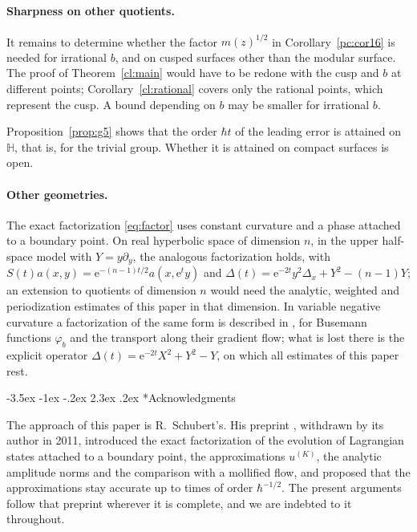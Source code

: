 \documentclass[twoside,10pt]{article}
\makeatletter
\numberwithin{equation}{section}
\theoremstyle{slbody}
\theoremstyle{remark}
\newcommand{\Hb}{\mathbb{H}}
\newcommand{\ue}{\mathrm{e}}
\renewcommand{\section}{%
  \@startsection{section}{1}{\z@}%
    {-3.5ex \@plus -1ex \@minus -.2ex}%
    {2.3ex \@plus .2ex}%
    {\normalfont\large\bfseries}}
\makeatother
\begin{document}
\paragraph{Sharpness on other quotients.} It remains to determine whether the factor $m(z)^{1/2}$ in Corollary~\ref{pc:cor16} is needed for irrational $b$,
and on cusped surfaces other than the modular surface. The proof of
Theorem~\ref{cl:main} would have to be redone with the cusp and $b$ at different
points; Corollary~\ref{cl:rational} covers only the rational points, which represent the cusp. A bound depending on $b$ may be
smaller for irrational $b$.

Proposition~\ref{prop:g5} shows that the order $\hbar t$ of the leading error is attained on
$\Hb$, that is, for the trivial group. Whether it is attained on compact surfaces is open.

\paragraph{Other geometries.} The exact factorization \eqref{eq:factor} uses constant curvature and a phase attached to a
boundary point. On real hyperbolic space of dimension $n$, in the upper half-space model with $Y=y\partial_y$, the
analogous factorization holds, with $S(t)a(x,y)=\ue^{-(n-1)t/2}a(x,\ue^ty)$ and
$\Delta(t)=\ue^{-2t}y^2\Delta_x+Y^2-(n-1)Y$; an extension to quotients of dimension $n$ would need the analytic, weighted and
periodization estimates of this paper in that dimension. In variable negative curvature a factorization of the same form
is described in \cite[Remark~1.11]{S}, for Busemann functions $\varphi_b$ and the transport along their gradient flow; what
is lost there is the explicit operator $\Delta(t)=\ue^{-2t}X^2+Y^2-Y$, on which all estimates of this paper rest.


\appendix





\clearpage
\section*{Acknowledgments}
The approach of this paper is R.~Schubert's. His preprint \cite{S}, withdrawn by its author in 2011, introduced the exact
factorization of the evolution of Lagrangian states attached to a boundary point, the approximations $u^{(K)}$, the analytic
amplitude norms and the comparison with a mollified flow, and proposed that the approximations stay accurate up to times of
order $\hbar^{-1/2}$. The present arguments follow that preprint wherever it is complete, and we are indebted to it throughout.
\end{document}
